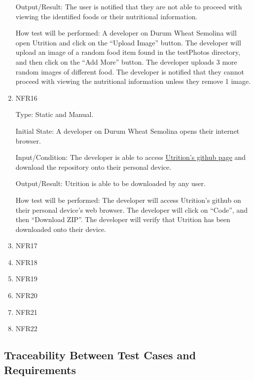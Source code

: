 \documentclass[12pt, titlepage]{article}
\begin{document}
\begin{enumerate}
Output/Result: The user is notified that they are not able to proceed with viewing the identified foods or their nutritional information.

How test will be performed: A developer on Durum Wheat Semolina will open Utrition and click on the “Upload Image” button. The developer will upload an image of a random food item found in the testPhotos directory, and then click on the “Add More” button. The developer uploads 3 more random images of different food. The developer is notified that they cannot proceed with viewing the nutritional information unless they remove 1 image.

\item{NFR16\\} 

Type: Static and Manual.

Initial State: A developer on Durum Wheat Semolina opens their internet browser.

Input/Condition: The developer is able to access \href{https://github.com/jeff-rey-wang/utrition}{Utrition’s github page} and download the repository onto their personal device.

Output/Result: Utrition is able to be downloaded by any user.

How test will be performed: The developer will access Utrition’s github on their personal device’s web browser. The developer will click on “Code”, and then “Download ZIP”. The developer will verify that Utrition has been downloaded onto their device.

\item{NFR17\\} 
\item{NFR18\\} 
\item{NFR19\\} 
\item{NFR20\\} 
\item{NFR21\\} 
\item{NFR22\\} 

\end{enumerate}

\subsection{Traceability Between Test Cases and Requirements}

\end{document}
